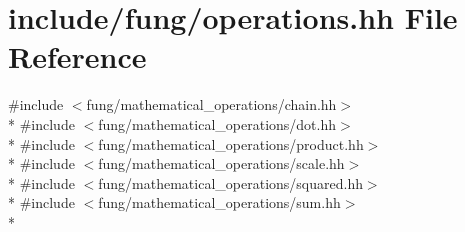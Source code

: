 \hypertarget{operations_8hh}{\section{include/fung/operations.hh File Reference}
\label{operations_8hh}
}
{\ttfamily \#include $<$fung/mathematical\-\_\-operations/chain.\-hh$>$}\\*
{\ttfamily \#include $<$fung/mathematical\-\_\-operations/dot.\-hh$>$}\\*
{\ttfamily \#include $<$fung/mathematical\-\_\-operations/product.\-hh$>$}\\*
{\ttfamily \#include $<$fung/mathematical\-\_\-operations/scale.\-hh$>$}\\*
{\ttfamily \#include $<$fung/mathematical\-\_\-operations/squared.\-hh$>$}\\*
{\ttfamily \#include $<$fung/mathematical\-\_\-operations/sum.\-hh$>$}\\*
